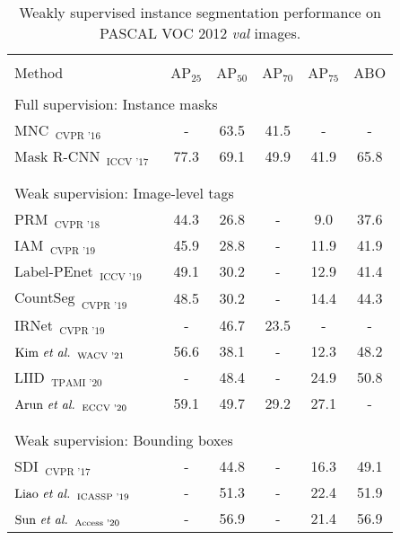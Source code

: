 \documentclass[final]{cvpr}
\begin{document}
\begin{table}[t]
\renewcommand{\arraystretch}{0.97}
\centering
\caption{Weakly supervised instance segmentation performance on PASCAL VOC 2012 \textit{val} images.}
\vspace{-0.8em}
  \label{instance_voc}
  
  \begin{tabular}{l @{\hskip 0.04in} c@{\hskip 0.04in}c @{\hskip 0.04in} c @{\hskip 0.04in}c@{\hskip 0.04in}c}
    \Xhline{1pt}\\[-0.95em]
     Method   & AP$_{25}$    & AP$_{50}$   & AP$_{70}$ & AP$_{75}$ & ABO\\
\hline\hline
    \\[-0.9em]
    \multicolumn{4}{l}{Full supervision: Instance masks } \\
    $\text{MNC}_{\text{~~CVPR '16}}$~\cite{dai2016instance} & - & 63.5 & 41.5 & -  & -  \\
    $\text{Mask R-CNN}_{\text{~~ICCV '17}}$~\cite{he2017mask}  
    & 77.3&   69.1   & 49.9    & 41.9  &  65.8 \\
  
    \\[-0.9em]
    \hline
    \\[-0.9em]
    \multicolumn{4}{l}{Weak supervision: Image-level tags } \\
     
    
    $\text{PRM}_{\text{~~CVPR '18}}$~\cite{zhou2018weakly} 
    & 44.3 &   26.8   &  -   & 9.0 & 37.6 \\
    $\text{IAM}_{\text{~~CVPR '19}}$~\cite{zhu2019learning}   
    & 45.9 & 28.8    &  -    & 11.9 & 41.9\\
    $\text{Label-PEnet}_{\text{~~ICCV '19}}$~\cite{ge2019label} 
    & 49.1 &   30.2 & - &      12.9 & 41.4 \\
    $\text{CountSeg}_{\text{~~CVPR '19}}$~\cite{cholakkal2019object} 
    & 48.5 & 30.2 &  -   &  14.4 & 44.3\\
    $\text{IRNet}_{\text{~~CVPR '19}}$~\cite{ahn2019weakly}   
    & - & 46.7    &  23.5    & -  & - \\
    $\text{Kim \textit{et al.}}_{\text{~~WACV '21}}$~\cite{hwang2021weakly} 
    & 56.6 & 38.1    &  -   & 12.3  & 48.2 \\
    $\text{LIID}_{\text{~~TPAMI '20}}$~\cite{liu2020leveraging}
    & - & 48.4 &  -  &  24.9 & 50.8 \\
    $\text{Arun \textit{et al.}}_{\text{~~ECCV '20}}$~\cite{arun2020weakly}  
    & 59.1 & 49.7 & 29.2  &  27.1 & - \\
    \\[-0.9em]
    \hline
    \\[-0.9em]
    \multicolumn{4}{l}{Weak supervision: Bounding boxes}\\
    $\text{SDI}_{\text{~~CVPR '17}}$~\cite{khoreva2017simple} 
    & - & 44.8 &  -   & 16.3 & 49.1 \\
    $\text{Liao \textit{et al.}}_{\text{~~ICASSP '19}}$~\cite{liao2019weakly} 
    & -& 51.3 &    -  &  22.4 & 51.9 \\
    $\text{Sun \textit{et al.}}_{\text{~~Access '20}}$~\cite{sun2020weakly}  
    &- & 56.9 &    -  &  21.4 & 56.9 \\
    

\end{tabular}
\end{table}
\end{document}
